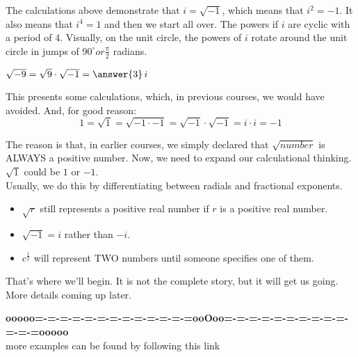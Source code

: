 \documentclass{ximera}
\begin{document}
The calculations above demonstrate that $i = \sqrt{-1}$, which means that $i^2 = -1$.  It also means that $i^4 = 1$ and then we start all over.  The powers if $i$ are cyclic with a period of $4$.  Visually, on the unit circle, the powers of $i$ rotate around the unit circle in jumps of $90^{\circ} or \frac{\pi}{2}$ radians.

\begin{question}


$\sqrt{-9} = \sqrt{9} \cdot \sqrt{-1} =  \answer{3} \, i$

\end{question}

This presents some calculations, which, in previous courses, we would have avoided. And, for good reason:\\

\[  1 = \sqrt{1} = \sqrt{-1 \cdot -1} = \sqrt{-1} \cdot \sqrt{-1} = i \cdot i = -1   \]


The reason is that, in earlier courses, we simply declared that $\sqrt{number}$ is ALWAYS a positive number.  Now, we need to expand our calculational thinking. $\sqrt{1}$ could be $1$ or $-1$. \\

Usually, we do this by differentiating between radials and fractional exponents.\\

\begin{itemize}
\item $\sqrt{r}$ still represents a positive real number if $r$ is a positive real number.
\item $\sqrt{-1} = i$ rather than $-i$.
\item $c^{\tfrac{1}{2}}$ will represent TWO numbers until someone specifies one of them.
\end{itemize}

That's where we'll begin.  It is not the complete story, but it will get us going.  More details coming up later.





\begin{center}
\textbf{\textcolor{green!50!black}{ooooo=-=-=-=-=-=-=-=-=-=-=-=-=ooOoo=-=-=-=-=-=-=-=-=-=-=-=-=ooooo}} \\

more examples can be found by following this link\\ 

\end{center}
\end{document}
